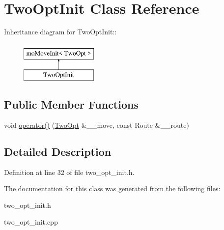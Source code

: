 \hypertarget{classTwoOptInit}{
\section{Two\-Opt\-Init Class Reference}
\label{classTwoOptInit}
}
Inheritance diagram for Two\-Opt\-Init::\begin{figure}[H]
\begin{center}
\leavevmode
\includegraphics[height=2cm]{classTwoOptInit}
\end{center}
\end{figure}
\subsection*{Public Member Functions}
\begin{CompactItemize}
\item 
\hypertarget{classTwoOptInit_5bf6af064d37ebd955ffb5a623e78e1b}{
void \hyperlink{classTwoOptInit_5bf6af064d37ebd955ffb5a623e78e1b}{operator()} (\hyperlink{classTwoOpt}{Two\-Opt} \&\_\-\_\-move, const Route \&\_\-\_\-route)}
\label{classTwoOptInit_5bf6af064d37ebd955ffb5a623e78e1b}

\end{CompactItemize}


\subsection{Detailed Description}




Definition at line 32 of file two\_\-opt\_\-init.h.

The documentation for this class was generated from the following files:\begin{CompactItemize}
\item 
two\_\-opt\_\-init.h\item 
two\_\-opt\_\-init.cpp\end{CompactItemize}
